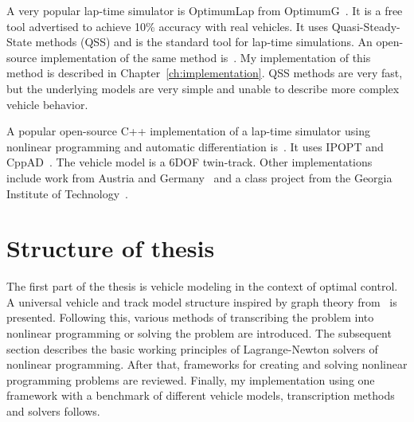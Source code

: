 A very popular lap-time simulator is OptimumLap from OptimumG~\cite{OptimumLapOptimumG}. It is a free tool advertised to achieve
10\% accuracy with real vehicles. It uses Quasi-Steady-State methods (QSS) and is the standard tool for lap-time simulations. An open-source implementation of the
same method is~\cite{mc12027Mc12027OpenLAPLapTimeSimulator2026}. My implementation of this method is described in Chapter~\ref{ch:implementation}. QSS methods are very fast, but the underlying models are very simple and unable to describe more complex vehicle behavior.

A popular open-source C++ implementation of a lap-time simulator using nonlinear
programming and automatic differentiation is~\cite{manzaneroJuanmanzaneroFastestlap2026}. It uses IPOPT and
CppAD~\cite{CoinorCppAD2026}. The vehicle model is a 6DOF twin-track. Other implementations include work from Austria and Germany~\cite{Heilmeier2019} and a class project from the Georgia Institute of Technology~\cite{2026ClassProject}.


\section{Structure of thesis}
The first part of the thesis is vehicle modeling in the context of optimal control. A universal vehicle and track model structure inspired by graph theory from~\cite{brown_engineering_2006} is presented. Following this, various methods of transcribing the problem into nonlinear programming or solving the problem are introduced. The subsequent section describes the basic working principles of Lagrange-Newton solvers of nonlinear programming. After that, frameworks for creating and solving nonlinear programming problems are reviewed. Finally, my implementation using one framework with a benchmark of different vehicle models, transcription methods and solvers follows.